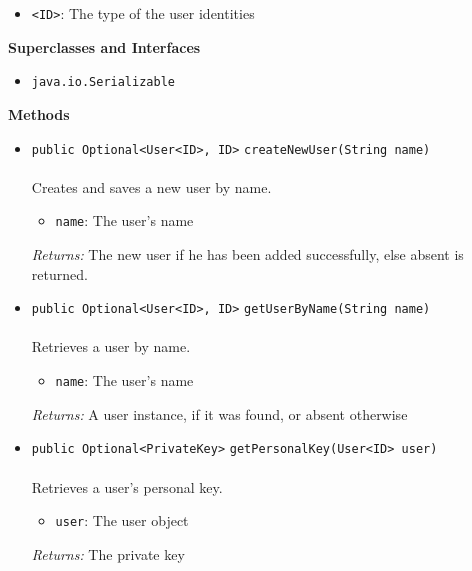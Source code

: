 \begin{itemize}
\item \lstinline|<ID>|: The type of the user identities
\end{itemize}


\textbf{\sffamily Superclasses and Interfaces}
\begin{itemize}
\item \lstinline|java.io.Serializable|
\end{itemize}



\textbf{\sffamily Methods}
\begin{itemize}
\item \lstinline|public Optional<User<ID>, ID>| \lstinline|createNewUser|\lstinline|(String name)|\\ \\[-0.6em]
Creates and saves a new user by name.
\begin{itemize}
\item \lstinline|name|: The user's name
\end{itemize}

\emph{Returns:} The new user if he has been added successfully, else absent is returned.

\item \lstinline|public Optional<User<ID>, ID>| \lstinline|getUserByName|\lstinline|(String name)|\\ \\[-0.6em]
Retrieves a user by name.
\begin{itemize}
\item \lstinline|name|: The user's name
\end{itemize}

\emph{Returns:} A user instance, if it was found, or absent otherwise

\item \lstinline|public Optional<PrivateKey>| \lstinline|getPersonalKey|\lstinline|(User<ID> user)|\\ \\[-0.6em]
Retrieves a user's personal key.
\begin{itemize}
\item \lstinline|user|: The user object
\end{itemize}

\emph{Returns:} The private key

\end{itemize}


